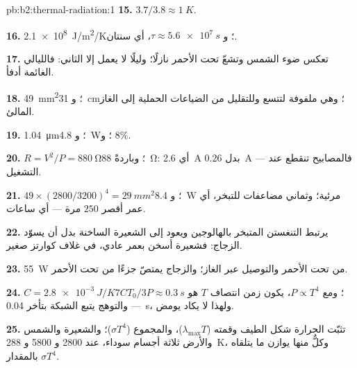 \begin{solution}{pb:b2:thermal-radiation:1}
\textbf{15.} $3.7/3.8 \approx \qty{1}{K}$.

\textbf{16.} \qty{2.1e8}{J/m^2/K}؛ و $\tau \approx \qty{5.6e7}{s}$، أي سنتان.

\textbf{17.} تعكس ضوء الشمس وتشعّ تحت الأحمر نازلًا؛ وليلًا
لا يعمل إلا الثاني: فالليالي الغائمة أدفأ.

\textbf{18.} \qty{49}{mm^2}؛ و \qty{31}{cm}؛ وهي ملفوفة لتتسع وللتقليل من
الضياعات الحملية إلى الغاز المالئ.

\textbf{19.} \qty{1.04}{\micro m}؛ و \qty{4.8}{W}؛ و $8\%$.

\textbf{20.} $R = V^2/P = \qty{880}{\ohm}$؛ وباردةً \qty{88}{\ohm}: أي \qty{2.6}{A}
بدل \qty{0.26}{A} --- فالمصابيح تنقطع عند التشغيل.

\textbf{21.} $49 \times (2800/3200)^4 = \qty{29}{mm^2}$؛ و \qty{8.4}{W} مرئية؛ وثماني
مضاعفات للتبخر، أي عمر أقصر $250$ مرة --- أي ساعات.

\textbf{22.} يرتبط التنغستن المتبخر بالهالوجين ويعود
إلى الشعيرة الساخنة بدل أن يسوّد الزجاج: فشعيرة أسخن
بعمر عادي، في غلاف كوارتز صغير.

\textbf{23.} \qty{55}{W} من تحت الأحمر والتوصيل عبر الغاز؛ والزجاج
يمتصّ جزءًا من تحت الأحمر.

\textbf{24.} $C = \qty{2.8e-3}{J/K}$؛ ومع $P \propto T^4$، يكون زمن انتصاف $T$
هو $7CT_0/3P \approx \qty{0.3}{s}$ --- والتوهج يتبع الشبكة
بتأخر \qty{0.04}{s}، ولهذا لا يكاد يومض.

\textbf{25.} تثبّت الحرارة شكل الطيف وقمته
($\lambda_{\max}T$)، والمجموع ($\sigma T^4$)؛ والشعيرة والشمس والأرض
ثلاثة أجسام سوداء، عند \qty{2800}{} و \qty{5800}{} و \qty{288}{K}، وكلٌّ منها
يوازن ما يتلقاه بالمقدار $\sigma T^4$.
\end{solution}
